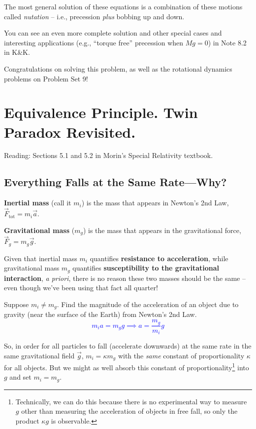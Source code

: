 \documentclass[11pt, letterpaper, openany]{book}
\newenvironment{exercise}[1][Exercise]{%
  \tcolorbox[blanker, breakable, left=1em,
    before skip=1em, after skip=1em,
    borderline west={3pt}{0pt}{PhysNavy},
    colback=PhysCream,
    before upper={\textcolor{PhysNavy}{\sffamily\bfseries #1:}\space}
  ]%
}{%
  \endtcolorbox%
}
\begin{document}
The most general solution of these equations is a combination of these motions called \textit{nutation} -- i.e., precession \textit{plus} bobbing up and down.

You can see an even more complete solution and other special cases and interesting applications (e.g., ``torque free'' precession when $Mg = 0$) in Note 8.2 in K\&K.

Congratulations on solving this problem, as well as the rotational dynamics problems on Problem Set 9!

\chapter{Equivalence Principle. Twin Paradox Revisited.}

Reading: Sections 5.1 and 5.2 in Morin's Special Relativity textbook.

\section*{Everything Falls at the Same Rate---Why?}

\textbf{Inertial mass} (call it $m_i$) is the mass that appears in Newton's 2nd Law, $\vec{F}_{\text{tot}} = m_i \vec{a}$.

\textbf{Gravitational mass} ($m_g$) is the mass that appears in the gravitational force, $\vec{F}_g = m_g \vec{g}$.

Given that inertial mass $m_i$ quantifies \textbf{resistance to acceleration}, while gravitational mass $m_g$ quantifies \textbf{susceptibility to the gravitational interaction}, \textit{a priori}, there is no reason these two masses should be the same -- even though we've been using that fact all quarter!

\begin{exercise}[Exercise 1]
Suppose $m_i \neq m_g$. Find the magnitude of the acceleration of an object due to gravity (near the surface of the Earth) from Newton's 2nd Law. \\
\textcolor{blue}{
\[ m_i a = m_g g \implies a = \frac{m_g}{m_i}g \]
}
\end{exercise}

So, in order for all particles to fall (accelerate downwards) at the same rate in the same gravitational field $\vec{g}$, $m_i = \kappa m_g$ with the \textit{same} constant of proportionality $\kappa$ for all objects. But we might as well absorb this constant of proportionality\footnote{Technically, we can do this because there is no experimental way to measure $g$ other than measuring the acceleration of objects in free fall, so only the product $\kappa g$ is observable.} into $g$ and set $m_i = m_g$.
\end{document}
